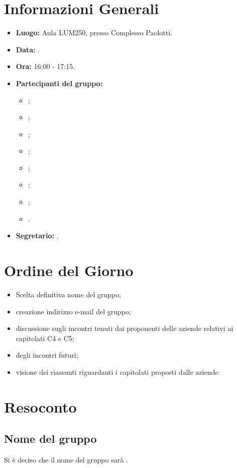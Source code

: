 \section{Informazioni Generali}
\begin{itemize}
\item \textbf{Luogo:} Aula LUM250, presso Complesso Paolotti.
\item \textbf{Data:} \Data.
\item \textbf{Ora:} 16:00 - 17:15.
\item \textbf{Partecipanti del gruppo:}
	\begin{itemize}
		\item \AT{}; 
		\item \BR{};
		\item \CE{}; 
		\item \DF{};
		\item \LD{};
		\item \MC{};
		\item \PF{};
		\item \SE{}.
	\end{itemize} 
\item \textbf{Segretario:} \BR{}.
\end{itemize}


\section{Ordine del Giorno}
\begin{itemize}
	\item Scelta definitiva nome del gruppo;
	\item creazione indirizzo e-mail del gruppo;
	\item discussione sugli incontri tenuti dai proponenti delle aziende relativi ai capitolati C4 e C5;
	\item {} degli incontri futuri;
	\item visione dei riassunti riguardanti i capitolati proposti dalle aziende.
\end{itemize}


\section{Resoconto}
\subsection{Nome del gruppo}
Si è deciso che il nome del gruppo sarà \Gruppo{}.


